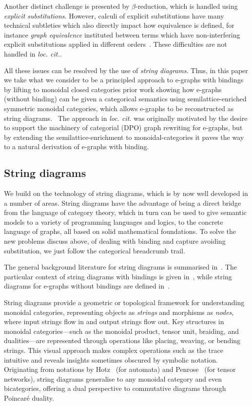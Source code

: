 \documentclass[]{IEEEtran}
\begin{document}
Another distinct challenge is presented by $\beta$-reduction, which is handled using \emph{explicit substitutions}. 
However, calculi of explicit substitutions have many technical subtleties which also directly impact how equivalence is defined, for instance \emph{graph equivalence} instituted between terms which have non-interfering explicit substitutions applied in different orders~\cite{doi:10.1145/2535838.2535886}. 
These difficulties are not handled in \emph{loc. cit.}.

All these issues can be resolved by the use of \emph{string diagrams}.
Thus, in this paper we take what we consider to be a principled approach to e-graphs with bindings by lifting to monoidal closed categories prior work showing how e-graphs (without binding) can be given a categorical semantics using semilattice-enriched symmetric monoidal categories, which allows e-graphs to be reconstructed as string diagrams.~\cite{ghica2024equivalencehypergraphsegraphsmonoidal}
The approach in \emph{loc. cit.} was originally motivated by the desire to support the machinery of categorial (DPO) graph rewriting for e-graphs, but by extending the semilattice-enrichment to monoidal-categories it paves the way to a natural derivation of e-graphs with binding.

\subsection{String diagrams}

We build on the technology of string diagrams, which is by now well developed in a number of areas. 
String diagrams have the advantage of being a direct bridge from the language of category theory, which in turn can be used to give semantic models to a variety of programming languages and logics, to the concrete language of graphs, all based on solid mathematical foundations. 
To solve the new problems discuss above, of dealing with binding and capture avoiding substitution, we just follow the categorical breadcrumb trail. 

The general background literature for string diagrams is summarised in~\cite{https://arxiv.org/abs/2305.08768}.
The particular context of string diagrams with bindings is given in~\cite{https://arxiv.org/abs/2305.18945}, while string diagrams for e-graphs without bindings are defined in~\cite{https://arxiv.org/abs/2406.15882}.

String diagrams provide a geometric or topological framework for understanding monoidal categories, representing objects as \emph{strings} and morphisms as \emph{nodes}, where input strings flow in and output strings flow out. 
Key structures in monoidal categories---such as the monoidal product, tensor unit, braiding, and dualities---are represented through operations like placing, weaving, or bending strings. 
This visual approach makes complex operations such as the trace intuitive and reveals insights sometimes obscured by symbolic notation. 
Originating from notations by Hotz~\cite{??} (for automata) and Penrose~\cite{??} (for tensor networks), string diagrams generalise to any monoidal category and even bicategories, offering a dual perspective to commutative diagrams through Poincaré duality. 
\end{document}

